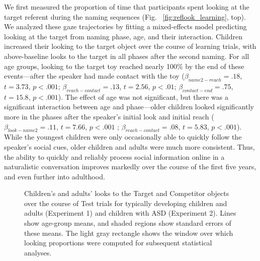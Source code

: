 \documentclass{pnastwo}
\begin{document}
\begin{article}
We first measured the proportion of time that participants spent looking at the target referent during the naming sequences (Fig. ~\ref{fig:reflook_learning}, top). We analyzed these gaze trajectories by fitting a mixed-effects model predicting looking at the target from naming phase, age, and their interaction. Children increased their looking to the target object over the course of learning trials, with above-baseline looks to the target in all phases after the second naming. For all age groups, looking to the target toy reached nearly 100\% by the end of these events---after the speaker had made contact with the toy ($\beta_{name2-reach} = .18$, $t = 3.73$, $p < .001$; $\beta_{reach-contact} = .13$, $t = 2.56$, $p < .01$; $\beta_{contact-end} = .75$, $t = 15.8$, $p < .001$). The effect of age was not significant, but there was a significant interaction between age and phase---older children looked significantly more in the phases after the speaker's initial look and initial reach ($\beta_{look-name2} = .11$, $t = 7.66$, $p < .001$ ; $\beta_{reach-contact} = .08$, $t = 5.83$, $p < .001$). While the youngest children were only occasionally able to quickly follow the speaker's social cues, older children and adults were much more consistent. Thus, the ability to quickly and reliably process social information online in a naturalistic conversation improves markedly over the course of the first five years, and even further into adulthood.


\begin{figure}[tb]
	\caption{Children's and adults' looks to the Target and Competitor objects over the course of Test trials for typically developing children and adults (Experiment 1) and children with ASD (Experiment 2). Lines show age-group means, and shaded regions show standard errors of these means. The light gray rectangle shows the window over which looking proportions were computed for subsequent statistical analyses.}
	\label{fig:reflook_timecourse}
\end{figure}



\end{article}
\end{document}
